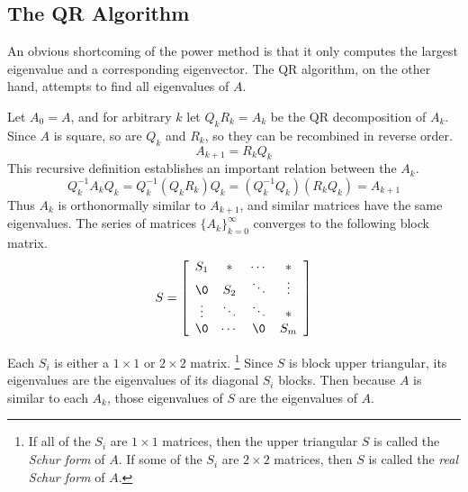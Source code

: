 
\subsection*{The QR Algorithm} %

An obvious shortcoming of the power method is that it only computes the largest eigenvalue and a corresponding eigenvector.
The QR algorithm, on the other hand, attempts to find all eigenvalues of $A$.

Let $A_0 = A$, and for arbitrary $k$ let $Q_kR_k = A_k$ be the QR decomposition of $A_k$.
Since $A$ is square, so are $Q_k$ and $R_k$, so they can be recombined in reverse order.
\[A_{k+1}=R_kQ_k\]
This recursive definition establishes an important relation between the $A_k$.
\[Q_k^{-1}A_kQ_k = Q_k^{-1}(Q_kR_k)Q_k = (Q_k^{-1}Q_k)(R_kQ_k) = A_{k+1}\]
Thus $A_k$ is orthonormally similar to $A_{k+1}$, and similar matrices have the same eigenvalues.
The series of matrices $\{A_k\}_{k=0}^\infty$ converges to the following block matrix.
\[
S =
\left[\begin{array}{cccc}
S_1    & *      & \cdots & *      \\
\0     & S_2    & \ddots & \vdots \\
\vdots & \ddots & \ddots & *      \\
\0     & \cdots &     \0 & S_m
\end{array}\right]
\]

Each $S_i$ is either a $1\times1$ or $2\times2$ matrix.%
\footnote{If all of the $S_i$ are $1\times1$ matrices, then the upper triangular $S$ is called the \emph{Schur form} of $A$.
If some of the $S_i$ are $2\times2$ matrices, then $S$ is called the \emph{real Schur form} of $A$.}
Since $S$ is block upper triangular, its eigenvalues are the eigenvalues of its diagonal $S_i$ blocks.
Then because $A$ is similar to each $A_k$, those eigenvalues of $S$ are the eigenvalues of $A$.


